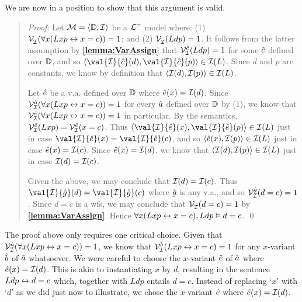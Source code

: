 \begin{multicols}{2}

  \begin{earg}
  \end{earg}

  \begin{earg}
  \end{earg}

\end{multicols}

We are now in a position to show that this argument is valid.

\begin{quote}
\label{unique1}
  \textit{Proof:}
  Let $\mathcal{M}=\langle\mathbb{D},\mathcal{I}\rangle$ be a $\mathcal{L}^{=}$ model where: (1) $\mathcal{V}_{\mathcal{I}}^{}(\forall x(Lxp \leftrightarrow x=c))=1$; and (2) $\mathcal{V}_{\mathcal{I}}^{}(Ldp)=1$.
  It follows from the latter assumption by \textbf{\ref{lemma:VarAssign}} that $\mathcal{V}_{\mathcal{I}}^{\hat{c}}(Ldp)=1$ for some $\hat{c}$ defined over $\mathbb{D}$, and so $\tuple{\val{\I}{\va{c}}(d),\val{\I}{\va{c}}(p)}\in\I(L)$.
  Since $d$ and $p$ are constants, we know by definition that $\langle\mathcal{I}(d),\mathcal{I}(p)\rangle\in\mathcal{I}(L)$.

  Let $\hat{e}$ be a v.a. defined over $\mathbb{D}$ where $\hat{e}(x)=\mathcal{I}(d)$.
  Since $\mathcal{V}_{\mathcal{I}}^{\hat{a}}(\forall x(Lxp \leftrightarrow x=c))=1$ for every $\hat{a}$ defined over $\mathbb{D}$ by (1), we know that $\mathcal{V}_{\mathcal{I}}^{\hat{e}}(\forall x(Lxp \leftrightarrow x=c))=1$ in particular.
  By the semantics, $\mathcal{V}_{\mathcal{I}}^{\hat{e}}(Lxp)=\mathcal{V}_{\mathcal{I}}^{\hat{e}}(x=c)$.
  Thus $\tuple{\val{\I}{\va{e}}(x),\val{\I}{\va{e}}(p)}\in\I(L)$ just in case $\val{\I}{\va{e}}(x)=\val{\I}{\va{e}}(c)$, and so $\langle\hat{e}(x),\mathcal{I}(p)\rangle\in\mathcal{I}(L)$ just in case $\hat{e}(x)=\mathcal{I}(c)$.
  Since $\hat{e}(x)=\mathcal{I}(d)$, we know that $\langle\mathcal{I}(d),\mathcal{I}(p)\rangle\in\mathcal{I}(L)$ just in case $\mathcal{I}(d)=\mathcal{I}(c)$.

  Given the above, we may conclude that $\mathcal{I}(d)=\mathcal{I}(c)$.
  Thus $\val{\I}{\va{g}}(d)=\val{\I}{\va{g}}(c)$ where $\hat{g}$ is any v.a., and so $\mathcal{V}_{\mathcal{I}}^{\hat{g}}(d=c)=1$.
  Since $d=c$ is a wfs, we may conclude that $\mathcal{V}_{\mathcal{I}}^{}(d=c)=1$ by \textbf{\ref{lemma:VarAssign}}. 
  Hence $\forall x(Lxp \leftrightarrow x=c), Ldp \vDash d=c$. 
  \qed
\end{quote}


The proof above only requires one critical choice.
Given that $\mathcal{V}_{\mathcal{I}}^{\hat{a}}(\forall x(Lxp \leftrightarrow x=c))=1$, we know that $\mathcal{V}_{\mathcal{I}}^{\hat{b}}(Lxp \leftrightarrow x=c)=1$ for any $x$-variant $\hat{b}$ of $\hat{a}$ whatsoever.
We were careful to choose the $x$-variant $\hat{e}$ of $\hat{a}$ where $\hat{e}(x)=\mathcal{I}(d)$.
This is akin to instantiating $x$ by $d$, resulting in the sentence $Ldp \leftrightarrow d=c$ which, together with $Ldp$ entails $d=c$.
Instead of replacing `$x$' with `$d$' as we did just now to illustrate, we chose the $x$-variant $\hat{e}$ where $\hat{e}(x)=\mathcal{I}(d)$.

